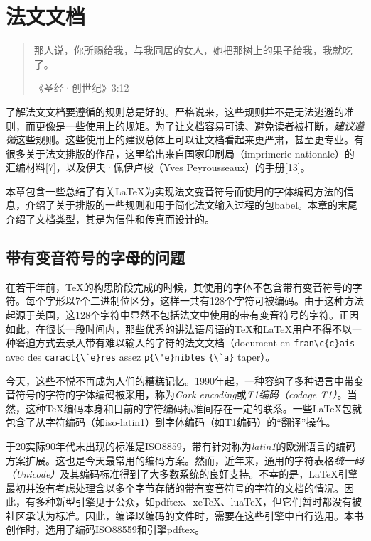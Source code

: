 \chapter{法文文档}

\begin{quote}
    那人说，你所赐给我，与我同居的女人，她把那树上的果子给我，我就吃了。
    
    \hfill《圣经·创世纪》3:12
\end{quote}

了解法文文档要遵循的规则总是好的。严格说来，这些规则并不是无法逃避的准则，而更像是一些使用上的规矩。为了让文档容易可读、避免读者被打断，\emph{建议遵循}这些规则。这些使用上的建议总体上可以让文档看起来更严肃，甚至更专业。有很多关于法文排版的作品，这里给出来自国家印刷局（imprimerie nationale）的汇编材料[7]，以及伊夫·佩伊卢梭（Yves Peyrousseaux）的手册[13]。

本章包含一些总结了有关\LaTeX 为实现法文变音符号而使用的字体编码方法的信息，介绍了关于排版的一些规则和用于简化法文输入过程的包\textsf{babel}。本章的末尾介绍了文档类型，其是为信件和传真而设计的。

\section{带有变音符号的字母的问题}

在若干年前，\TeX 的构思阶段完成的时候，其使用的字体不包含带有变音符号的字符。每个字形以7个二进制位区分，这样一共有128个字符可被编码。由于这种方法起源于美国，这128个字符中显然不包括法文中使用的带有变音符号的字符。正因如此，在很长一段时间内，那些优秀的讲法语母语的\TeX 和\LaTeX 用户不得不以一种窘迫方式去录入带有难以输入的字符的法文文档（document en \verb+fran\c{c}ais+ avec des \verb+caract{\`e}res+ assez \verb+p{\'e}nibles+ \verb+{\`a}+ taper）。

今天，这些不悦不再成为人们的糟糕记忆。1990年起，一种容纳了多种语言中带变音符号的字符的字体编码被采用，称为\emph{Cork encoding}或\emph{T1编码（codage T1）}。当然，这种\TeX 编码本身和目前的字符编码标准间存在一定的联系。一些\LaTeX 包就包含了从字符编码（如iso-latin1）到字体编码（如T1编码）的“翻译”操作。

\begin{exclamation}
    于20实际90年代末出现的标准是ISO8859，带有针对称为\emph{latin1}的欧洲语言的编码方案扩展。这也是今天最常用的编码方案。然而，近年来，通用的字符表格\emph{统一码（Unicode）}及其编码标准得到了大多数系统的良好支持。不幸的是，\LaTeX 引擎最初并没有考虑处理含以多个字节存储的带有变音符号的字符的文档的情况。因此，有多种新型引擎见于公众，如pdftex、xe\TeX 、lua\TeX ，但它们暂时都没有被社区承认为标准。因此，编译以编码的文件时，需要在这些引擎中自行选用。本书创作时，选用了编码ISO88559和引擎pdftex。
\end{exclamation}

